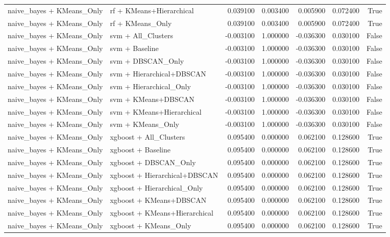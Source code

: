 \begin{tabular}{llrrrrr}
naive_bayes + KMeans_Only & rf + KMeans+Hierarchical & 0.039100 & 0.003400 & 0.005900 & 0.072400 & True \\
naive_bayes + KMeans_Only & rf + KMeans_Only & 0.039100 & 0.003400 & 0.005900 & 0.072400 & True \\
naive_bayes + KMeans_Only & svm + All_Clusters & -0.003100 & 1.000000 & -0.036300 & 0.030100 & False \\
naive_bayes + KMeans_Only & svm + Baseline & -0.003100 & 1.000000 & -0.036300 & 0.030100 & False \\
naive_bayes + KMeans_Only & svm + DBSCAN_Only & -0.003100 & 1.000000 & -0.036300 & 0.030100 & False \\
naive_bayes + KMeans_Only & svm + Hierarchical+DBSCAN & -0.003100 & 1.000000 & -0.036300 & 0.030100 & False \\
naive_bayes + KMeans_Only & svm + Hierarchical_Only & -0.003100 & 1.000000 & -0.036300 & 0.030100 & False \\
naive_bayes + KMeans_Only & svm + KMeans+DBSCAN & -0.003100 & 1.000000 & -0.036300 & 0.030100 & False \\
naive_bayes + KMeans_Only & svm + KMeans+Hierarchical & -0.003100 & 1.000000 & -0.036300 & 0.030100 & False \\
naive_bayes + KMeans_Only & svm + KMeans_Only & -0.003100 & 1.000000 & -0.036300 & 0.030100 & False \\
naive_bayes + KMeans_Only & xgboost + All_Clusters & 0.095400 & 0.000000 & 0.062100 & 0.128600 & True \\
naive_bayes + KMeans_Only & xgboost + Baseline & 0.095400 & 0.000000 & 0.062100 & 0.128600 & True \\
naive_bayes + KMeans_Only & xgboost + DBSCAN_Only & 0.095400 & 0.000000 & 0.062100 & 0.128600 & True \\
naive_bayes + KMeans_Only & xgboost + Hierarchical+DBSCAN & 0.095400 & 0.000000 & 0.062100 & 0.128600 & True \\
naive_bayes + KMeans_Only & xgboost + Hierarchical_Only & 0.095400 & 0.000000 & 0.062100 & 0.128600 & True \\
naive_bayes + KMeans_Only & xgboost + KMeans+DBSCAN & 0.095400 & 0.000000 & 0.062100 & 0.128600 & True \\
naive_bayes + KMeans_Only & xgboost + KMeans+Hierarchical & 0.095400 & 0.000000 & 0.062100 & 0.128600 & True \\
naive_bayes + KMeans_Only & xgboost + KMeans_Only & 0.095400 & 0.000000 & 0.062100 & 0.128600 & True \\

\end{tabular}
